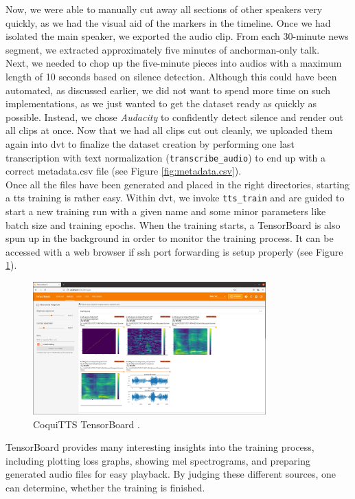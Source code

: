 \documentclass[
  a4paper,  %
  twoside,  %
  bibliography=totoc,
  headsepline,
  cleardoublepage=empty,
  parskip=half,
  draft=false
]{scrbook}
\begin{document}
Now, we were able to manually cut away all sections of other speakers very quickly, as we had the visual aid of the markers in the timeline. Once we had isolated the main speaker, we exported the audio clip. From each 30-minute news segment, we extracted approximately five minutes of anchorman-only talk.\\
Next, we needed to chop up the five-minute pieces into audios with a maximum length of 10 seconds based on silence detection. Although this could have been automated, as discussed earlier, we did not want to spend more time on such implementations, as we just wanted to get the dataset ready as quickly as possible. Instead, we chose \textit{Audacity} to confidently detect silence and render out all clips at once. Now that we had all clips cut out cleanly, we uploaded them again into \gls{dvt} to finalize the dataset creation by performing one last transcription with text normalization (\verb|transcribe_audio|) to end up with a correct metadata.csv file (see Figure \ref{fig:metadata.csv}). \\
Once all the files have been generated and placed in the right directories, starting a \gls{tts} training is rather easy. Within \gls{dvt}, we invoke \verb|tts_train| and are guided to start a new training run with a given name and some minor parameters like batch size and training epochs. When the training starts, a TensorBoard is also spun up in the background in order to monitor the training process. It can be accessed with a web browser if \gls{ssh} port forwarding is setup properly (see Figure \ref{fig:tensorboard}).

\begin{figure}[h]
  \centering
  \includegraphics[width=0.8\textwidth]{./graphics/tts/tensorboard.png}
  \caption{CoquiTTS TensorBoard \cite{TensorboardPngMbarnig2022}.}
  \label{fig:tensorboard}
\end{figure}

TensorBoard provides many interesting insights into the training process, including plotting loss graphs, showing mel spectrograms, and preparing generated audio files for easy playback. By judging these different sources, one can determine, whether the training is finished. 
\end{document}
